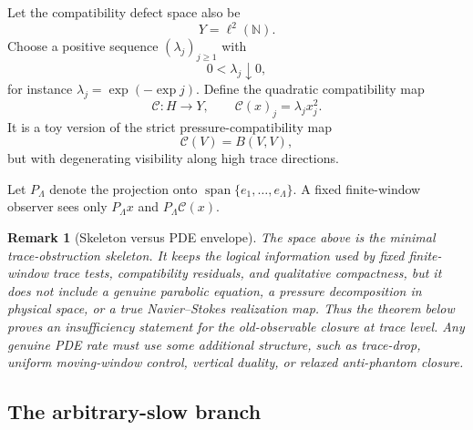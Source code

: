 \documentclass[11pt]{article}
\numberwithin{equation}{section}
\newtheorem{remark}[theorem]{Remark}
\newcommand{\N}{\mathbb N}
\newcommand{\calC}{\mathcal C}
\begin{document}
Let the compatibility defect space also be
\[
Y=\ell^2(\N).
\]
Choose a positive sequence \((\lambda_j)_{j\ge1}\) with
\[
0<\lambda_j\downarrow0,
\]
for instance \(\lambda_j=\exp(-\exp j)\).  Define the quadratic compatibility map
\begin{equation}\label{eq:l2-compatibility-expanded}
\calC:H\to Y,
\qquad
\calC(x)_j=\lambda_jx_j^2.
\end{equation}
It is a toy version of the strict pressure-compatibility map
\[
\calC(V)=B(V,V),
\]
but with degenerating visibility along high trace directions.

Let \(P_\Lambda\) denote the projection onto \(\operatorname{span}\{e_1,\ldots,e_\Lambda\}\).  A fixed finite-window observer sees only \(P_\Lambda x\) and \(P_\Lambda\calC(x)\).

\begin{remark}[Skeleton versus PDE envelope]\label{rem:skeleton-vs-pde-envelope}
The space above is the \emph{minimal trace-obstruction skeleton}.  It keeps the logical information used by fixed finite-window trace tests, compatibility residuals, and qualitative compactness, but it does not include a genuine parabolic equation, a pressure decomposition in physical space, or a true Navier--Stokes realization map.  Thus the theorem below proves an insufficiency statement for the old-observable closure at trace level.  Any genuine PDE rate must use some additional structure, such as trace-drop, uniform moving-window control, vertical duality, or relaxed anti-phantom closure.
\end{remark}

\subsection{The arbitrary-slow branch}
\end{document}
